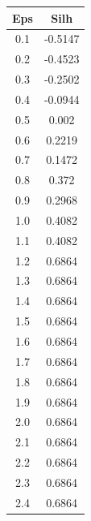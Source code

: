 \documentclass{classrep}
\begin{document}
{{{                \begin{table}[!htbp]
                    \begin{minipage}{.24\textwidth}
                        \centering
                        \begin{tabular}{|c|c|}
                            \hline
                            Eps & Silh \\ \hline
                            0.1 & -0.5147 \\ \hline
                            0.2 & -0.4523 \\ \hline
                            0.3 & -0.2502 \\ \hline
                            0.4 & -0.0944 \\ \hline
                            0.5 & 0.002 \\ \hline
                            0.6 & 0.2219 \\ \hline
                            0.7 & 0.1472 \\ \hline
                            0.8 & 0.372 \\ \hline
                            0.9 & 0.2968 \\ \hline
                            1.0 & 0.4082 \\ \hline
                            1.1 & 0.4082 \\ \hline
                            1.2 & 0.6864 \\ \hline
                            1.3 & 0.6864 \\ \hline
                            1.4 & 0.6864 \\ \hline
                            1.5 & 0.6864 \\ \hline
                            1.6 & 0.6864 \\ \hline
                            1.7 & 0.6864 \\ \hline
                            1.8 & 0.6864 \\ \hline
                            1.9 & 0.6864 \\ \hline
                            2.0 & 0.6864 \\ \hline
                            2.1 & 0.6864 \\ \hline
                            2.2 & 0.6864 \\ \hline
                            2.3 & 0.6864 \\ \hline
                            2.4 & 0.6864 \\ \hline

\end{tabular}
\end{minipage}
\end{table}}}}
\end{document}
